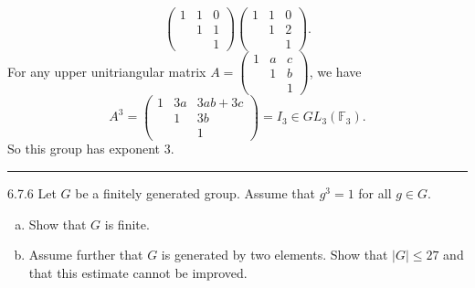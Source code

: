 \documentclass[a4paper, 12pt]{article}
\begin{document}
\begin{solution}
\[\begin{pmatrix}
    1&1&0\\ 
    &1&1\\ 
    &&1
\end{pmatrix}\begin{pmatrix}
    1&1&0\\ 
    &1&2\\ 
    &&1
\end{pmatrix}.\]
For any upper unitriangular matrix \(A=\begin{pmatrix}
    1&a&c\\ 
    &1&b\\ 
    &&1
\end{pmatrix}\), we have 
\[A^3=\begin{pmatrix}
    1& 3a&3ab+3c\\ 
    &1&3b\\ 
    &&1
\end{pmatrix}=I_3\in GL_3(\mathbb{F}_3).\] 
So this group has exponent \(3\).
\end{solution}

\noindent\rule{7in}{2.8pt}
\begin{problem}{6.7.6}
Let \(G\) be a finitely generated group. Assume that \(g^3=1\) for all \(g\in G\).
\begin{enumerate}[(a)]
\item Show that \(G\) is finite. 
\item Assume further that \(G\) is generated by two elements. Show that \(|G|\leq 27\) and that this estimate cannot be improved.
\end{enumerate}
\end{problem}
\begin{solution}

\end{solution}
\end{document}
